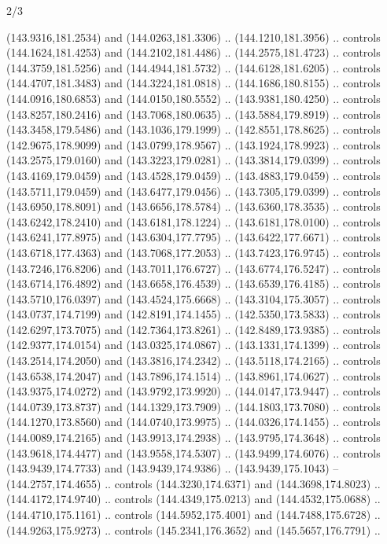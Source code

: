 \begin{flagdescription}{2/3}
\begin{scope}[shift={(0.5\flaglength,0.5)},scale=\flagwidth/320]
\begin{scope}[y=0.8pt, x=0.8pt, yscale=-1,shift={(-118.3,-146)}]
  (143.9316,181.2534) and (144.0263,181.3306) .. (144.1210,181.3956) .. controls
  (144.1624,181.4253) and (144.2102,181.4486) .. (144.2575,181.4723) .. controls
  (144.3759,181.5256) and (144.4944,181.5732) .. (144.6128,181.6205) .. controls
  (144.4707,181.3483) and (144.3224,181.0818) .. (144.1686,180.8155) .. controls
  (144.0916,180.6853) and (144.0150,180.5552) .. (143.9381,180.4250) .. controls
  (143.8257,180.2416) and (143.7068,180.0635) .. (143.5884,179.8919) .. controls
  (143.3458,179.5486) and (143.1036,179.1999) .. (142.8551,178.8625) .. controls
  (142.9675,178.9099) and (143.0799,178.9567) .. (143.1924,178.9923) .. controls
  (143.2575,179.0160) and (143.3223,179.0281) .. (143.3814,179.0399) .. controls
  (143.4169,179.0459) and (143.4528,179.0459) .. (143.4883,179.0459) .. controls
  (143.5711,179.0459) and (143.6477,179.0456) .. (143.7305,179.0399) .. controls
  (143.6950,178.8091) and (143.6656,178.5784) .. (143.6360,178.3535) .. controls
  (143.6242,178.2410) and (143.6181,178.1224) .. (143.6181,178.0100) .. controls
  (143.6241,177.8975) and (143.6304,177.7795) .. (143.6422,177.6671) .. controls
  (143.6718,177.4363) and (143.7068,177.2053) .. (143.7423,176.9745) .. controls
  (143.7246,176.8206) and (143.7011,176.6727) .. (143.6774,176.5247) .. controls
  (143.6714,176.4892) and (143.6658,176.4539) .. (143.6539,176.4185) .. controls
  (143.5710,176.0397) and (143.4524,175.6668) .. (143.3104,175.3057) .. controls
  (143.0737,174.7199) and (142.8191,174.1455) .. (142.5350,173.5833) .. controls
  (142.6297,173.7075) and (142.7364,173.8261) .. (142.8489,173.9385) .. controls
  (142.9377,174.0154) and (143.0325,174.0867) .. (143.1331,174.1399) .. controls
  (143.2514,174.2050) and (143.3816,174.2342) .. (143.5118,174.2165) .. controls
  (143.6538,174.2047) and (143.7896,174.1514) .. (143.8961,174.0627) .. controls
  (143.9375,174.0272) and (143.9792,173.9920) .. (144.0147,173.9447) .. controls
  (144.0739,173.8737) and (144.1329,173.7909) .. (144.1803,173.7080) .. controls
  (144.1270,173.8560) and (144.0740,173.9975) .. (144.0326,174.1455) .. controls
  (144.0089,174.2165) and (143.9913,174.2938) .. (143.9795,174.3648) .. controls
  (143.9618,174.4477) and (143.9558,174.5307) .. (143.9499,174.6076) .. controls
  (143.9439,174.7733) and (143.9439,174.9386) .. (143.9439,175.1043) --
  (144.2757,174.4655) .. controls (144.3230,174.6371) and (144.3698,174.8023) ..
  (144.4172,174.9740) .. controls (144.4349,175.0213) and (144.4532,175.0688) ..
  (144.4710,175.1161) .. controls (144.5952,175.4001) and (144.7488,175.6728) ..
  (144.9263,175.9273) .. controls (145.2341,176.3652) and (145.5657,176.7791) ..

\end{scope}
\end{scope}
\end{flagdescription}
